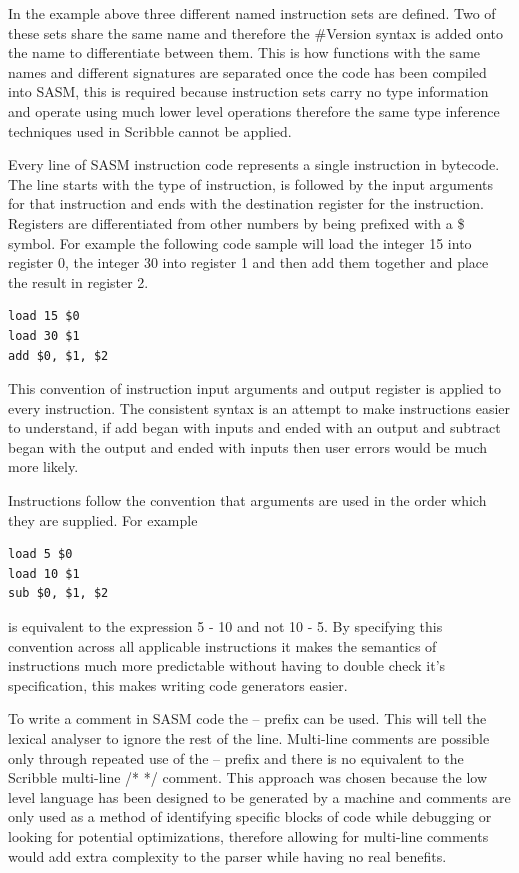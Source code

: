 \documentclass[]{final_report}
\begin{document}
In the example above three different named instruction sets are defined. Two of these sets share the same name and therefore the \#Version syntax is added onto the name to differentiate between them. This is how functions with the same names and different signatures are separated once the code has been compiled into SASM, this is required because instruction sets carry no type information and operate using much lower level operations therefore the same type inference techniques used in Scribble cannot be applied.

Every line of SASM instruction code represents a single instruction in bytecode. The line starts with the type of instruction, is followed by the input arguments for that instruction and ends with the destination register for the instruction. Registers are differentiated from other numbers by being prefixed with a \$ symbol. For example the following code sample will load the integer 15 into register 0, the integer 30 into register 1 and then add them together and place the result in register 2.

\begin{verbatim}
load 15 $0
load 30 $1
add $0, $1, $2
\end{verbatim}

This convention of instruction input arguments and output register is applied to every instruction. The consistent syntax is an attempt to make instructions easier to understand, if add began with inputs and ended with an output and subtract began with the output and ended with inputs then user errors would be much more likely.

Instructions follow the convention that arguments are used in the order which they are supplied. For example
\begin{verbatim}load 5 $0
load 10 $1
sub $0, $1, $2
\end{verbatim}
is equivalent to the expression 5 - 10 and not 10 - 5. By specifying this convention across all applicable instructions it makes the semantics of instructions much more predictable without having to double check it's specification, this makes writing code generators easier.

To write a comment in SASM code the -- prefix can be used. This will tell the lexical analyser to ignore the rest of the line. Multi-line comments are possible only through repeated use of the -- prefix and there is no equivalent to the Scribble multi-line /* */ comment. This approach was chosen because the low level language has been designed to be generated by a machine and comments are only used as a method of identifying specific blocks of code while debugging or looking for potential optimizations, therefore allowing for multi-line comments would add extra complexity to the parser while having no real benefits.
\end{document}
